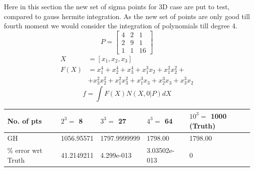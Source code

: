 \documentclass{article}
\begin{document}
Here in this section the new set of sigma points for 3D case are put to test, compared to gauss hermite integration. As the new set of points are only good till fourth moment we would consider the integration of polynomials till degree 4.\newline
\[
 P = \begin{bmatrix}
       4 & 2 & 1    \\
       2 & 9 & 1     \\
       1 & 1 & 16
     \end{bmatrix}
\]
\begin{align}
X&=[x_1,x_2,x_3]\\
F(X)&=x_1^4+x_2^4+x_3^4+x_1^3x_2+x_1^2x_2^2+\\
 &+x_3^2x_2^2+x_1^2x_3^2+x_1^3x_3+x_2^3x_3+x_3^3x_2
\end{align}
\begin{equation}
f=\int{F(X)N(X,0|P)}dX
\end{equation}
\begin{center}
  \begin{tabular}{ | l | l | l | l | l | }
    \hline
       No. of pts 					& $2^3=$ 8 							& $3^3=$ 27 			  & $4^3=$ 64			 & $10^3=$ 1000 (Truth) \\ \hline 
      GH          					&   1056.95571  			  & 1797.9999999      & 1798.00     	 &   1798.00           \\ \hline
\% error wrt Truth       	  &   41.2149211    			&  4.299e-013  	  	& 3.03502e-013   &   0         \\ 
      \hline
  \end{tabular}
\end{center} 
\end{document}
